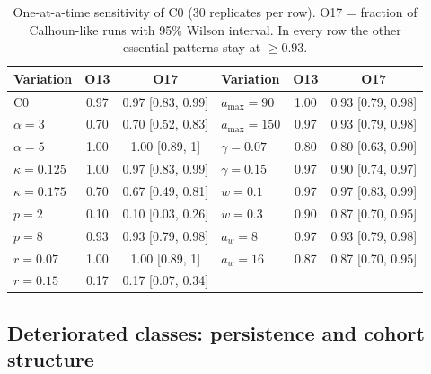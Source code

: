 \begin{table}[t]
  \centering
  \caption{One-at-a-time sensitivity of \textsf{C0} (30 replicates per row). O17 = fraction of
  Calhoun-like runs with 95\% Wilson interval. In every row the other essential patterns stay at $\ge0.93$.}
  \label{tab:calib-oat}
  \small
  \begin{tabular}{@{}lcc@{\qquad}lcc@{}}
    \toprule
    Variation & O13 & O17 & Variation & O13 & O17 \\
    \midrule
    \textsf{C0} & 0.97 & 0.97 [0.83, 0.99] & $a_{\max}=90$ & 1.00 & 0.93 [0.79, 0.98] \\
    $\alpha=3$ & 0.70 & 0.70 [0.52, 0.83] & $a_{\max}=150$ & 0.97 & 0.93 [0.79, 0.98] \\
    $\alpha=5$ & 1.00 & 1.00 [0.89, 1] & $\gamma=0.07$ & 0.80 & 0.80 [0.63, 0.90] \\
    $\kappa=0.125$ & 1.00 & 0.97 [0.83, 0.99] & $\gamma=0.15$ & 0.97 & 0.90 [0.74, 0.97] \\
    $\kappa=0.175$ & 0.70 & 0.67 [0.49, 0.81] & $w=0.1$ & 0.97 & 0.97 [0.83, 0.99] \\
    $p=2$ & 0.10 & 0.10 [0.03, 0.26] & $w=0.3$ & 0.90 & 0.87 [0.70, 0.95] \\
    $p=8$ & 0.93 & 0.93 [0.79, 0.98] & $a_w=8$ & 0.97 & 0.93 [0.79, 0.98] \\
    $r=0.07$ & 1.00 & 1.00 [0.89, 1] & $a_w=16$ & 0.87 & 0.87 [0.70, 0.95] \\
    $r=0.15$ & 0.17 & 0.17 [0.07, 0.34] & & & \\
    \bottomrule
  \end{tabular}
\end{table}

\subsection{Deteriorated classes: persistence and cohort structure}
\label{sec:calib-classes}

